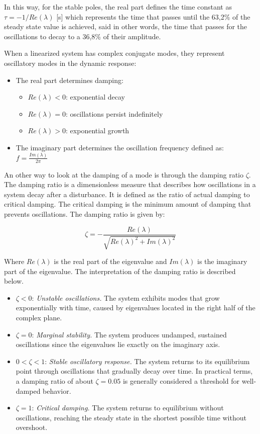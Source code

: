 In this way, for the stable poles, the real part defines the time constant as $\tau = -1/ Re(\lambda) $ [s] which represents the time that passes until
the 63,2\% of the steady state value is achieved, said in other words, the time that passes for the oscillations to decay to a 36,8\% of their amplitude.

When a linearized system has complex conjugate modes, they represent oscillatory modes in the dynamic response:

\begin{itemize}
  \item The real part determines damping:
  \begin{itemize}
    \item $Re(\lambda) < 0$: exponential decay
    \item $Re(\lambda) = 0$: oscillations persist indefinitely
    \item $Re(\lambda) > 0$: exponential growth
  \end{itemize}
  \item The imaginary part determines the oscillation frequency defined as: $f = \frac{Im(\lambda)}{2\pi}$
\end{itemize}

An other way to look at the damping of a mode is through the damping ratio $\zeta$. The damping ratio is a dimensionless measure that describes how oscillations 
in a system decay after a disturbance. It is defined as the ratio of actual damping to critical damping. The critical damping is the minimum amount of damping that prevents oscillations. 
The damping ratio is given by: 

\begin{equation}
  \zeta = -  \frac{Re(\lambda)}{\sqrt{Re(\lambda)^2+Im(\lambda)^2}}
\end{equation}

Where $Re(\lambda)$ is the real part of the eigenvalue and $Im(\lambda)$ is the imaginary part of the eigenvalue. The interpretation of the damping ratio is described below.

\begin{itemize}
  \item $\zeta < 0$: \textit{Unstable oscillations.} The system exhibits modes that grow exponentially with time, caused by eigenvalues located in the right half of the complex plane.
  \item $\zeta = 0$: \textit{Marginal stability.} The system produces undamped, sustained oscillations since the eigenvalues lie exactly on the imaginary axis.
  \item $0 < \zeta < 1$: \textit{Stable oscillatory response.} The system returns to its equilibrium point through oscillations that gradually decay over time. 
  In practical terms, a damping ratio of about $\zeta = 0.05$ is generally considered a threshold for well-damped behavior.
  \item $\zeta = 1$: \textit{Critical damping.} The system returns to equilibrium without oscillations, reaching the steady state in the shortest possible time without overshoot.
\end{itemize}

